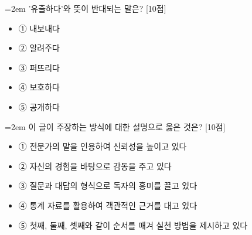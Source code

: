 \documentclass[12pt,a4paper]{article}
\newcommand{\qnum}[1]{%
  \tikz[baseline=(num.base)]{%
    \node[circle, fill=numCircle, text=white, inner sep=0pt,
          minimum size=18pt, font=\small\bfseries] (num) {#1};%
  }%
}
\newcommand{\pts}[1]{%
  \hfill\textcolor{ptsBadge}{[#1점]}%
}
\begin{document}
\vspace{4mm}
\begin{minipage}{\columnwidth}
{\hangindent=2em
\qnum{31}\enspace '유출하다'와 뜻이 반대되는 말은? \pts{10}
\par}

\vspace{3mm}
\begin{itemize}[leftmargin=2.5em, labelsep=0.3em, label={}, itemsep=4pt, parsep=1pt, topsep=0pt]
  \item ① 내보내다
  \item ② 알려주다
  \item ③ 퍼뜨리다
  \item ④ 보호하다
  \item ⑤ 공개하다
\end{itemize}
\end{minipage}
\vspace{4mm}

\vspace{4mm}
\begin{minipage}{\columnwidth}
{\hangindent=2em
\qnum{32}\enspace 이 글이 주장하는 방식에 대한 설명으로 옳은 것은? \pts{10}
\par}

\vspace{3mm}
\begin{itemize}[leftmargin=2.5em, labelsep=0.3em, label={}, itemsep=4pt, parsep=1pt, topsep=0pt]
  \item ① 전문가의 말을 인용하여 신뢰성을 높이고 있다
  \item ② 자신의 경험을 바탕으로 감동을 주고 있다
  \item ③ 질문과 대답의 형식으로 독자의 흥미를 끌고 있다
  \item ④ 통계 자료를 활용하여 객관적인 근거를 대고 있다
  \item ⑤ 첫째, 둘째, 셋째와 같이 순서를 매겨 실천 방법을 제시하고 있다
\end{itemize}
\end{minipage}
\vspace{4mm}
\end{document}
